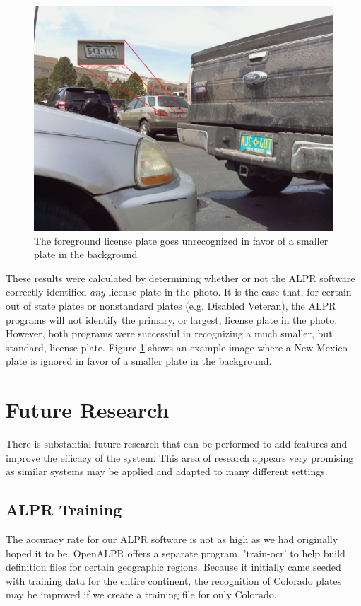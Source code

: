 \documentclass[11pt, oneside, fullpage, doublespace]{article}
\begin{document}
\begin{figure}
\begin{center}
\includegraphics[width=4.5in]{unexpectedrecognition}
\end{center}
\caption{The foreground license plate goes unrecognized in favor of a smaller plate in the background}
\label{fig:unexpectedrecognition}
\end{figure}

These results were calculated by determining whether or not the ALPR software correctly identified \emph{any} license plate in the photo. It is the case that, for certain out of state plates or nonstandard plates (e.g. Disabled Veteran), the ALPR programs will not identify the primary, or largest, license plate in the photo. However, both programs were successful in recognizing a much smaller, but standard, license plate. Figure \ref{fig:unexpectedrecognition} shows an example image where a New Mexico plate is ignored in favor of a smaller plate in the background.
\section{Future Research}
There is substantial future research that can be performed to add features and improve the efficacy of the system. This area of research appears very promising as similar systems may be applied and adapted to many different settings.

\subsection{ALPR Training}
The accuracy rate for our ALPR software is not as high as we had originally hoped it to be. OpenALPR offers a separate program, 'train-ocr' to help build definition files for certain geographic regions. Because it initially came seeded with training data for the entire continent, the recognition of Colorado plates may be improved if we create a training file for only Colorado.
\end{document}
